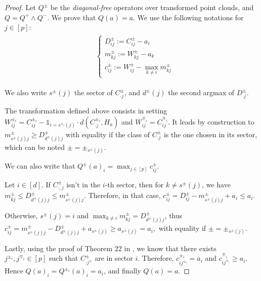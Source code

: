 \documentclass[oneside,english]{amsart}
\numberwithin{equation}{section}
\numberwithin{figure}{section}
\theoremstyle{plain}
\theoremstyle{definition}
\theoremstyle{plain}
\theoremstyle{remark}
\theoremstyle{plain}
\theoremstyle{definition}
\theoremstyle{definition}
\begin{document}
\begin{proof}
Let $Q^{\pm}$ be the \emph{diagonal-free} operators over transformed point clouds, and $Q = Q^+ \wedge Q^-.$ We prove that $Q(a) = a$. We use the following notations for $j\in [p]$:
$$\begin{gathered}
\begin{aligned}
& \left\{
\begin{array}{l}
D^{\pm}_{ij} := C_{ij}^{\pm} - a_i  \\
m_{kj}^{\pm} := W^{\pm}_{kj} - a_k \\
c^{\pm}_{ij} :=  W^{\pm}_{ij} - \max_{k\ne i} m^{\pm}_{kj}
\end{array}
\right.
\end{aligned}
\end{gathered}$$

We also write $s^\pm(j)$ the sector of $C^\pm_{\cdot j}$, and $d^\pm(j)$ the second argmax of $D^\pm_{\cdot j}$.

The transformation defined above consists in setting $W^{\pm_i}_{ij} = C^{\pm_i}_{ij} - \mathbb{1}_{i= s^{\pm_i}(j)} \cdot d(C^{\pm_i}_{\cdot j}, H_a)$ and $W^{\mp_i}_{ij} = C^{\mp_i}_{ij}$. It leads by construction to $m_{s^{\pm}(j)j}^{\pm} \geq D^{\pm}_{d^{\pm}(j)j}$  with equality if the class of $C^\pm_{\cdot j}$ is the one chosen in its sector, which can be noted  $\pm = \pm_{s^{\pm}(j)}$.



We can also write that $Q^{\pm}(a)_i = \max_{j \in [p]} c^{\pm}_{ij}.$



Let $i\in [d]$. If $C^{\pm}_{\cdot, j}$ isn't in the $i$-th sector, then for $k \neq s^{\pm}(j) $, we have $m_{kj}^\pm \leq D^{\pm}_{d^{\pm}(j)j} \leq m_{s^{\pm}(j)j}^{\pm}$. Therefore, in that case, $c^{\pm}_{ij} = D^{\pm}_{ij} - m_{s^{\pm}(j)j}^{\pm} + a_i \leq a_i.$

Otherwise, $s^{\pm}(j) = i $ and $\max_{k\ne i} m^{\pm}_{kj} = D^{\pm}_{d^{\pm}(j)j}$, thus $c^{\pm}_{ij} =   m_{s^{\pm}(j)j}^{\pm} - D^{\pm}_{d^{\pm}(j)j}+ a_{s^{\pm}(j)} \geq a_{s^{\pm}(j)} = a_i, $
with equality if $\pm = \pm_{s^{\pm}(j)}$.


Lastly, using the proof of Theorem 22 in \cite{Akian2021TropicalLR}, we know that there exists $j^{\pm_i}, j^{\mp_i}\in [p]$ such that $C^{\pm}_{\cdot j^{\pm}}$ are in sector $i$. Therefore, $c_{ij^{\pm_i}}^{\pm_i} = a_i$ and $c_{ij^{\mp_i}}^{\mp_i} \geq a_i$. Hence
$Q(a)_i= Q^{\pm_i}(a)_i = a_i$, and finally $Q(a)=a$.


\end{proof}
\end{document}
